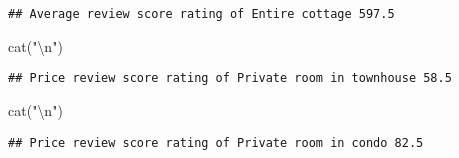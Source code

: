 \documentclass[
]{article}
\newenvironment{Shaded}{\begin{snugshade}}{\end{snugshade}}
\newcommand{\FunctionTok}[1]{\textcolor[rgb]{0.00,0.00,0.00}{#1}}
\newcommand{\NormalTok}[1]{#1}
\newcommand{\OtherTok}[1]{\textcolor[rgb]{0.56,0.35,0.01}{#1}}
\newcommand{\SpecialCharTok}[1]{\textcolor[rgb]{0.00,0.00,0.00}{#1}}
\newcommand{\StringTok}[1]{\textcolor[rgb]{0.31,0.60,0.02}{#1}}
\begin{document}
\begin{verbatim}
## Average review score rating of Entire cottage 597.5
\end{verbatim}

\begin{Shaded}
\begin{Highlighting}[]
\FunctionTok{cat}\NormalTok{(}\StringTok{"}\SpecialCharTok{\textbackslash{}n}\StringTok{"}\NormalTok{)}
\end{Highlighting}
\end{Shaded}

\begin{Shaded}
\end{Shaded}

\begin{verbatim}
## Price review score rating of Private room in townhouse 58.5
\end{verbatim}

\begin{Shaded}
\begin{Highlighting}[]
\FunctionTok{cat}\NormalTok{(}\StringTok{"}\SpecialCharTok{\textbackslash{}n}\StringTok{"}\NormalTok{)}
\end{Highlighting}
\end{Shaded}

\begin{Shaded}
\end{Shaded}

\begin{verbatim}
## Price review score rating of Private room in condo 82.5
\end{verbatim}
\end{document}
